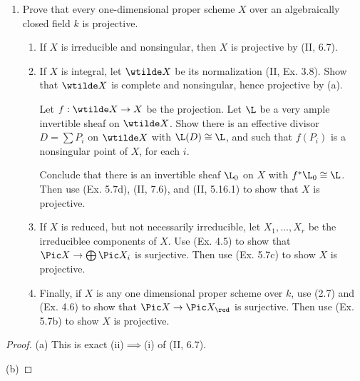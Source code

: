 \documentclass[12pt]{amsart}
\begin{document}
\begin{enumerate}
  \item[5.8.] {
      Prove that every one-dimensional proper scheme $X$ over an algebraically closed field $k$ is projective.
      \begin{enumerate}
        \item If $X$ is irreducible and nonsingular, then $X$ is projective by (II, 6.7).
        \item If $X$ is integral, let $\wtilde X$ be its normalization (II, Ex. 3.8).
          Show that $\wtilde X$ is complete and nonsingular, hence projective by (a).

          Let $f:\wtilde X\to X$ be the projection.
          Let $\L$ be a very ample invertible sheaf on $\wtilde X$.
          Show there is an effective divisor $D=\sum P_i$ on $\wtilde X$ with $\L(D)\cong \L$, and such that $f(P_i)$ is a nonsingular point of $X$, for each $i$.

          Conclude that there is an invertible sheaf $\L_0$ on $X$ with $f^*\L_0\cong \L$.
          Then use (Ex. 5.7d), (II, 7.6), and (II, 5.16.1) to show that $X$ is projective.
        \item If $X$ is reduced, but not necessarily irreducible, let $X_1,\ldots, X_r$ be the irreduciblee components of $X$.
          Use (Ex. 4.5) to show that $\Pic X\to \bigoplus \Pic X_i$ is surjective.
          Then use (Ex. 5.7c) to show $X$ is projective.
        \item Finally, if $X$ is any one dimensional proper scheme over $k$, use (2.7) and (Ex. 4.6) to show that $\Pic X\to \Pic X_\red$ is surjective.
          Then use (Ex. 5.7b) to show $X$ is projective.
      \end{enumerate}
    }
\end{enumerate}

\begin{proof}
  (a) This is exact (ii)$\implies$(i) of (II, 6.7).

  (b) 
\end{proof}
\end{document}
